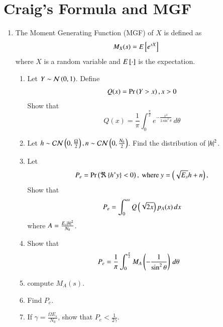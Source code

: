 \documentclass[journal,12pt,twocolumn]{IEEEtran}
\renewcommand\thesection{\arabic{section}}
\begin{document}
\section{Craig's Formula and MGF}
\begin{enumerate}[label=\thesection.\arabic*
,ref=\thesection.\theenumi]

\item
The Moment Generating Function (MGF) of $X$ is defined as
%
\begin{align}
M_{X}(s) = E{}\left[e^{s X}\right]
\end{align}
%
where $X$ is a random variable and $E{}\left[\cdot\right]$ is the expectation.  
%
%
\begin{enumerate}
\item Let $Y \sim \mathcal{N}\left(0,1\right)$.  Define
%
\begin{align}
Q(x) = \Pr\left(Y > x\right), x > 0
\end{align}
%
Show that
\begin{equation}
Q(x) = \frac{1}{\pi}\int^{\frac{\pi}{2}}_{0}e^{-\frac{x^2}{2\sin^2 \theta}}\,d\theta
\end{equation}
\item 
Let $h\sim\mathcal{CN}\left(0,\frac{\Omega}{2}\right),n\sim\mathcal{CN}\left(0,\frac{N_0}{2}\right)$.  Find the distribution of $\left\vert h\right\vert^2$.

\item Let
%
\begin{align}
P_e = \Pr\left(\Re \left\{h^*y\right\} < 0\right), \text{ where } y = \left(\sqrt{E_s}h + n\right),
\end{align}
%
Show that
%
\begin{align}
P_e = \int_{0}^{\infty}Q\left(\sqrt{2x}\right)p_{A}(x) \,dx
\end{align}
where $A = \frac{E_s\left\vert h\right\vert^2}{N_0}$.
\item Show that
%
\begin{align}
P_e 
&=  \frac{1}{\pi}\int_{0}^{\frac{\pi}{2}}M_{A}\left(-\frac{1}{\sin^2\theta}\right)\,d\theta
\label{ch4_pe_mgf}
\end{align}
%
\item compute $M_A(s)$.
%
\item 
Find $P_e$.
\item 
If $\gamma = \frac{\Omega E_s}{N_0}$, show that $P_e < \frac{1}{2\gamma}$. 
\end{enumerate}






\end{enumerate}
\end{document}
